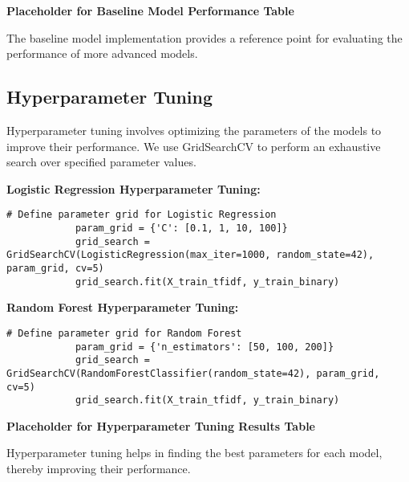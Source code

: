         \textbf{Placeholder for Baseline Model Performance Table}

        The baseline model implementation provides a reference point for evaluating the performance of more advanced models.
            
    \subsection{Hyperparameter Tuning}
    
        Hyperparameter tuning involves optimizing the parameters of the models to improve their performance. We use GridSearchCV to perform an exhaustive search over specified parameter values.

        \textbf{Logistic Regression Hyperparameter Tuning:}
        
        \vspace{0.5em}

        \begin{lstlisting}[caption={Parameter grid for Logistic Regression}, label={lst:param_grid_logistic}]
            # Define parameter grid for Logistic Regression
            param_grid = {'C': [0.1, 1, 10, 100]}
            grid_search = GridSearchCV(LogisticRegression(max_iter=1000, random_state=42), param_grid, cv=5)
            grid_search.fit(X_train_tfidf, y_train_binary)
        \end{lstlisting}

        \textbf{Random Forest Hyperparameter Tuning:}
        
        \vspace{0.5em}

        \begin{lstlisting}[caption={Parameter grid for Random Forest}, label={lst:param_grid_rf}]
            # Define parameter grid for Random Forest
            param_grid = {'n_estimators': [50, 100, 200]}
            grid_search = GridSearchCV(RandomForestClassifier(random_state=42), param_grid, cv=5)
            grid_search.fit(X_train_tfidf, y_train_binary)
        \end{lstlisting}

        \textbf{Placeholder for Hyperparameter Tuning Results Table}

        Hyperparameter tuning helps in finding the best parameters for each model, thereby improving their performance.
            
